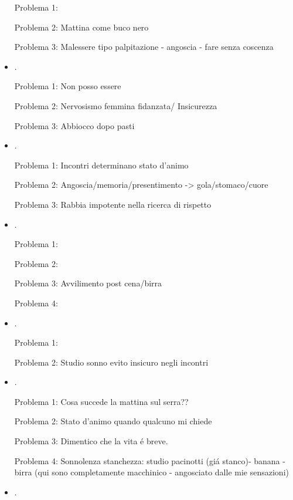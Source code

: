 \begin{itemize}
Problema 1: 

Problema 2: Mattina come buco nero

Problema 3: Malessere tipo palpitazione - angoscia - fare senza coscenza

\item {}.

Problema 1: Non posso essere 

Problema 2: Nervosismo femmina fidanzata/ Insicurezza

Problema 3: Abbiocco dopo pasti

\item {}.

Problema 1: Incontri determinano stato d'animo

Problema 2: Angoscia/memoria/presentimento -> gola/stomaco/cuore

Problema 3: Rabbia impotente nella ricerca di rispetto

\item {}.

Problema 1: 

Problema 2: 

Problema 3: Avvilimento post cena/birra

Problema 4: 

\item {}.

Problema 1: 

Problema 2: Studio sonno evito insicuro negli incontri

\item {}.

Problema 1: Cosa succede la mattina sul serra??

Problema 2: Stato d'animo quando qualcuno mi chiede

Problema 3: Dimentico che la vita \'e breve.

Problema 4: Sonnolenza stanchezza: studio pacinotti (gi\'a stanco)- banana - birra (qui sono completamente macchinico - angosciato dalle mie sensazioni)

\item {}.


\end{itemize}
